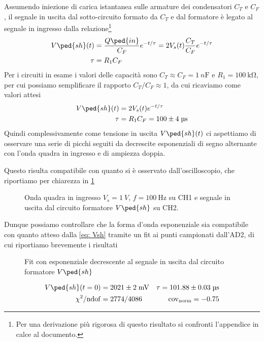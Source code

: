 \documentclass[10pt, a4paper, italian]{article}
\begin{document}
Assumendo iniezione di carica istantanea sulle armature dei condensatori $C_T$
e $C_F$, il segnale in uscita dal sotto-circuito formato da $C_T$ e dal
formatore è legato al segnale in ingresso dalla relazione\footnote{Per una
derivazione più rigorosa di questo risultato si confronti l'appendice
in calce al documento.}
\begin{align}\label{eq: Vsh}
V\ped{sh}(t) &= \frac{Q\ped{in}}{C_F} e^{-t/\tau} =
2V_s(t) \frac{C_T}{C_F} e^{-t/\tau} \\
\tau &= R_1 C_F
\end{align}
Per i circuiti in esame i valori delle capacità sono
$C_T \approx C_F = \SI{1}{n\F}$ e $R_1 = \SI{100}{\kilo\ohm}$,
per cui possiamo semplificare il rapporto $C_T/C_F \approx 1$, da cui
ricaviamo come valori attesi
\begin{align*}
V\ped{sh}(t) &= 2V_s(t) e^{-t/\tau} \\
\tau &= R_1 C_F = 100 \pm 4 \; \si{\micro\s}
\end{align*}
Quindi complessivamente come tensione in uscita $V\ped{sh} (t)$ ci aspettiamo
di osservare una serie di picchi seguiti da decrescite esponenziali di segno
alternante con l'onda quadra in ingresso e di ampiezza doppia.

Questo risulta compatibile con quanto si è osservato dall'oscilloscopio, che
riportiamo per chiarezza in \cref{fig: shaper}
\begin{figure}[htbp]
    \centering
    \caption{Onda quadra in ingresso $V_s = \SI{1}{V}$, $f = \SI{100}{\Hz}$
    su CH1 e segnale in uscita dal circuito formatore $V\ped{sh}$ su CH2.
    \label{fig: shaper}}
\end{figure}

Dunque possiamo controllare che la forma d'onda esponenziale sia compatibile
con quanto atteso dalla \eqref{eq: Vsh} tramite un fit ai punti campionati
dall'AD2, di cui riportiamo brevemente i risultati
\begin{figure}[htbp]
    \centering
    \caption{Fit con esponenziale decrescente al segnale in uscita dal
    circuito formatore $V\ped{sh}$ \label{fig: tau}}
\end{figure}
\begin{align*}
V\ped{sh} (t=0) &= 2021 \pm 2 \; \si{m\V}
&\tau = 101.88 \pm 0.03 \; \si{\micro\s} \\
\chi^2/\mathrm{ndof} &= 2774/4086 &\mathrm{cov_{norm}} = -0.75
\end{align*}
\end{document}
